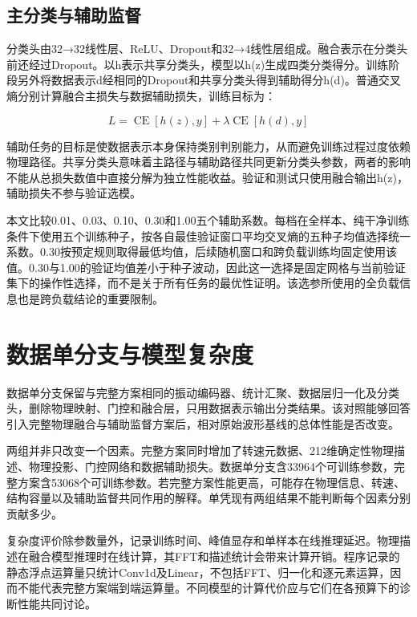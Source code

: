 \documentclass[UTF8,12pt,openany,twoside]{ctexbook}
\numberwithin{equation}{chapter}
\begin{document}
\subsection{主分类与辅助监督}\label{ux4e3bux5206ux7c7bux4e0eux8f85ux52a9ux76d1ux7763}

分类头由32→32线性层、ReLU、Dropout和32→4线性层组成。融合表示在分类头前还经过Dropout。以h表示共享分类头，模型以h(z)生成四类分类得分。训练阶段另外将数据表示d经相同的Dropout和共享分类头得到辅助得分h(d)。普通交叉熵分别计算融合主损失与数据辅助损失，训练目标为：

\begin{equation}
\label{eq:auto13}
L=\operatorname{CE}[h(z),y]+\lambda\operatorname{CE}[h(d),y]
\end{equation}


辅助任务的目标是使数据表示本身保持类别判别能力，从而避免训练过程过度依赖物理路径。共享分类头意味着主路径与辅助路径共同更新分类头参数，两者的影响不能从总损失数值中直接分解为独立性能收益。验证和测试只使用融合输出h(z)，辅助损失不参与验证选模。

本文比较0.01、0.03、0.10、0.30和1.00五个辅助系数。每档在全样本、纯干净训练条件下使用五个训练种子，按各自最佳验证窗口平均交叉熵的五种子均值选择统一系数。0.30按预定规则取得最低均值，后续随机窗口和跨负载训练均固定使用该值。0.30与1.00的验证均值差小于种子波动，因此这一选择是固定网格与当前验证集下的操作性选择，而不是关于所有任务的最优性证明。该选参所使用的全负载信息也是跨负载结论的重要限制。

\section{数据单分支与模型复杂度}\label{ux6570ux636eux5355ux5206ux652fux4e0eux6a21ux578bux590dux6742ux5ea6}

数据单分支保留与完整方案相同的振动编码器、统计汇聚、数据层归一化及分类头，删除物理映射、门控和融合层，只用数据表示输出分类结果。该对照能够回答引入完整物理融合与辅助监督方案后，相对原始波形基线的总体性能是否改变。

两组并非只改变一个因素。完整方案同时增加了转速元数据、212维确定性物理描述、物理投影、门控网络和数据辅助损失。数据单分支含33964个可训练参数，完整方案含53068个可训练参数。若完整方案性能更高，可能存在物理信息、转速、结构容量以及辅助监督共同作用的解释。单凭现有两组结果不能判断每个因素分别贡献多少。

复杂度评价除参数量外，记录训练时间、峰值显存和单样本在线推理延迟。物理描述在融合模型推理时在线计算，其FFT和描述统计会带来计算开销。程序记录的静态浮点运算量只统计Conv1d及Linear，不包括FFT、归一化和逐元素运算，因而不能代表完整方案端到端运算量。不同模型的计算代价应与它们在各预算下的诊断性能共同讨论。
\end{document}
